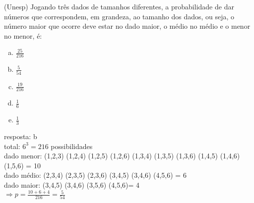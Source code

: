 \begin{ex}
 	(Unesp)  Jogando três dados de tamanhos diferentes, a probabilidade  de dar números que correspondem, em grandeza, ao tamanho dos dados, ou seja, o número maior que ocorre deve estar no dado maior, o médio no médio e o menor no menor, é:
    \begin{enumerate}[(a)]
    \item $\frac{25}{216}$
    \item $\frac{5}{54}$
    \item $\frac{19}{216}$
    \item $\frac{1}{6}$
    \item $\frac{1}{3}$
    \end{enumerate}
       \begin{sol}
         resposta: b \\
         total: $6^3 = 216$ possibilidades\\
         dado menor: (1,2,3) (1,2,4) (1,2,5) (1,2,6) (1,3,4) (1,3,5) (1,3,6) (1,4,5) (1,4,6) (1,5,6) = 10 \\
         dado médio: (2,3,4) (2,3,5) (2,3,6) (3,4,5) (3,4,6) (4,5,6) = 6 \\
         dado maior: (3,4,5) (3,4,6) (3,5,6) (4,5,6)= 4 \\
         $\Longrightarrow p= \frac{10+6+4}{216}=\frac{5}{54}$
       \end{sol}
\end{ex}